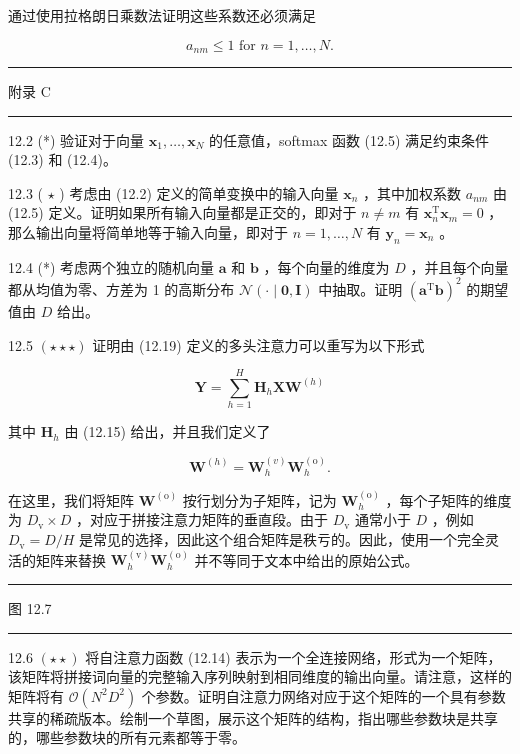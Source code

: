 \documentclass[10pt]{article}
\newcommand{\HRule}{\begin{center}\rule{0.9\linewidth}{0.2mm}\end{center}}
\begin{document}
通过使用拉格朗日乘数法证明这些系数还必须满足

\[
{a}_{nm} \leq  1\text{ for }n = 1,\ldots ,N. \tag{12.41}
\]

\HRule

附录 C

\HRule

12.2 (*) 验证对于向量 \({\mathbf{x}}_{1},\ldots ,{\mathbf{x}}_{N}\) 的任意值，softmax 函数 (12.5) 满足约束条件 (12.3) 和 (12.4)。

12.3 ( \(\star\) ) 考虑由 (12.2) 定义的简单变换中的输入向量 \({\mathbf{x}}_{n}\) ，其中加权系数 \({a}_{nm}\) 由 (12.5) 定义。证明如果所有输入向量都是正交的，即对于 \(n \neq  m\) 有 \({\mathbf{x}}_{n}^{\mathrm{T}}{\mathbf{x}}_{m} = 0\) ，那么输出向量将简单地等于输入向量，即对于 \(n = 1,\ldots ,N\) 有 \({\mathbf{y}}_{n} = {\mathbf{x}}_{n}\) 。

12.4 (*) 考虑两个独立的随机向量 \(\mathbf{a}\) 和 \(\mathbf{b}\) ，每个向量的维度为 \(D\) ，并且每个向量都从均值为零、方差为 1 的高斯分布 \(\mathcal{N}\left( {\cdot  \mid  \mathbf{0},\mathbf{I}}\right)\) 中抽取。证明 \({\left( {\mathbf{a}}^{\mathrm{T}}\mathbf{b}\right) }^{2}\) 的期望值由 \(D\) 给出。

12.5 \(\left( {\star  \star   \star  }\right)\) 证明由 (12.19) 定义的多头注意力可以重写为以下形式

\[
\mathbf{Y} = \mathop{\sum }\limits_{{h = 1}}^{H}{\mathbf{H}}_{h}\mathbf{X}{\mathbf{W}}^{\left( h\right) } \tag{12.42}
\]

其中 \({\mathbf{H}}_{h}\) 由 (12.15) 给出，并且我们定义了

\[
{\mathbf{W}}^{\left( h\right) } = {\mathbf{W}}_{h}^{\left( v\right) }{\mathbf{W}}_{h}^{\left( \mathrm{o}\right) }. \tag{12.43}
\]

在这里，我们将矩阵 \({\mathbf{W}}^{\left( \mathrm{o}\right) }\) 按行划分为子矩阵，记为 \({\mathbf{W}}_{h}^{\left( \mathrm{o}\right) }\) ，每个子矩阵的维度为 \({D}_{\mathrm{v}} \times  D\) ，对应于拼接注意力矩阵的垂直段。由于 \({D}_{\mathrm{v}}\) 通常小于 \(D\) ，例如 \({D}_{\mathrm{v}} = D/H\) 是常见的选择，因此这个组合矩阵是秩亏的。因此，使用一个完全灵活的矩阵来替换 \({\mathbf{W}}_{h}^{\left( \mathrm{v}\right) }{\mathbf{W}}_{h}^{\left( \mathrm{o}\right) }\) 并不等同于文本中给出的原始公式。

\HRule

图 12.7

\HRule

12.6 \(\left( {\star  \star  }\right)\) 将自注意力函数 (12.14) 表示为一个全连接网络，形式为一个矩阵，该矩阵将拼接词向量的完整输入序列映射到相同维度的输出向量。请注意，这样的矩阵将有 \(\mathcal{O}\left( {{N}^{2}{D}^{2}}\right)\) 个参数。证明自注意力网络对应于这个矩阵的一个具有参数共享的稀疏版本。绘制一个草图，展示这个矩阵的结构，指出哪些参数块是共享的，哪些参数块的所有元素都等于零。
\end{document}
